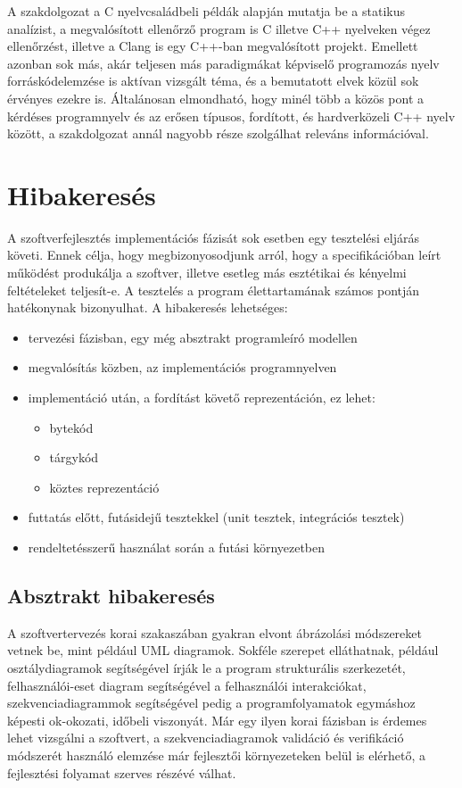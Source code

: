 \documentclass[a4paper,12pt]{report}
\begin{document}
A szakdolgozat a C nyelvcsaládbeli példák alapján mutatja be a statikus analízist, a megvalósított ellenőrző program is C illetve C++ nyelveken végez ellenőrzést, illetve a Clang is egy C++-ban megvalósított projekt. Emellett azonban sok más, akár teljesen más paradigmákat képviselő programozás nyelv forráskódelemzése is aktívan vizsgált téma, és a bemutatott elvek közül sok érvényes ezekre is. Általánosan elmondható, hogy minél több a közös pont a kérdéses programnyelv és az erősen típusos, fordított, és hardverközeli C++ nyelv között, a szakdolgozat annál nagyobb része szolgálhat releváns információval.

\section{Hibakeresés}
A szoftverfejlesztés implementációs fázisát sok esetben egy tesztelési eljárás követi. Ennek célja, hogy megbizonyosodjunk arról, hogy a specifikációban leírt működést produkálja a szoftver, illetve esetleg más esztétikai és kényelmi feltételeket teljesít-e.
A tesztelés a program élettartamának számos pontján hatékonynak bizonyulhat. A hibakeresés lehetséges:
\begin{itemize}
\item tervezési fázisban, egy még absztrakt programleíró modellen
\item megvalósítás közben, az implementációs programnyelven
\item implementáció után, a fordítást követő reprezentáción, ez lehet:
\begin{itemize}
\item bytekód
\item tárgykód
\item köztes reprezentáció
\end{itemize}
\item futtatás előtt, futásidejű tesztekkel (unit tesztek, integrációs tesztek)
\item rendeltetésszerű használat során a futási környezetben \cite{chaosmonkey}
\end{itemize}

\subsection{Absztrakt hibakeresés}
A szoftvertervezés korai szakaszában gyakran elvont ábrázolási módszereket vetnek be, mint például UML diagramok. Sokféle szerepet elláthatnak, például osztálydiagramok segítségével írják le a program strukturális szerkezetét, felhasználói-eset diagram segítségével a felhasználói interakciókat, szekvenciadiagrammok segítségével pedig a programfolyamatok egymáshoz képesti ok-okozati, időbeli viszonyát. Már egy ilyen korai fázisban is érdemes lehet vizsgálni a szoftvert, a szekvenciadiagramok validáció és verifikáció módszerét használó elemzése  \cite{umlverification} már fejlesztői környezeteken belül is elérhető, a fejlesztési folyamat szerves részévé válhat.
\end{document}
